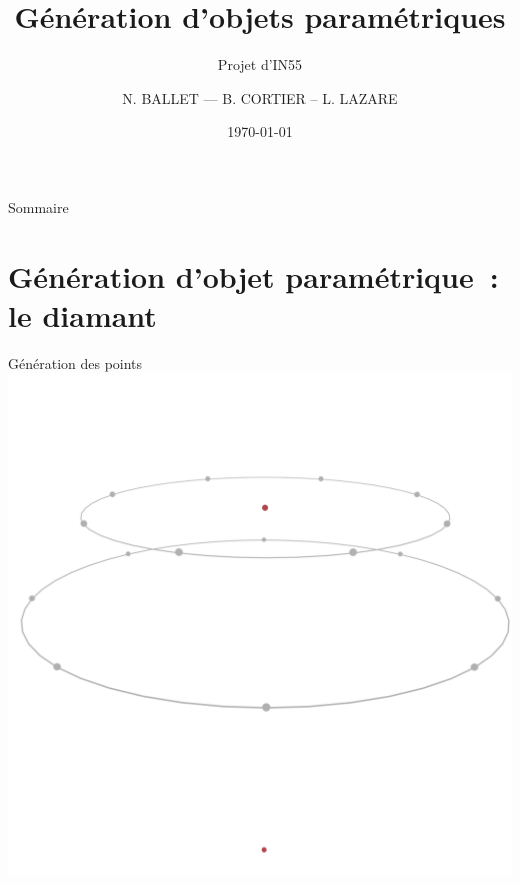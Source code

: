 \documentclass[11pt]{beamer}
\author{N. BALLET — B. CORTIER – L. LAZARE}
\institute[]{UTBM}
\title{Génération d'objets paramétriques}
\subtitle{Projet d'IN55}
\date{\today{}}
\begin{document}
\begin{frame}
    \titlepage{}
\end{frame}

\begin{frame}{Sommaire}
    \tableofcontents
\end{frame}

\section{Génération d'objet paramétrique~: le diamant}

\begin{frame}{Génération des points}
    {\centering \includegraphics[height=0.95\textheight]{Maillage/circles}}
\end{frame}
\end{document}
